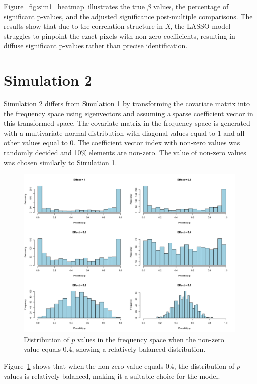 \documentclass[12pt]{article}
\begin{document}
Figure~\ref{fig:sim1_heatmap} illustrates the true \(\beta\) values, the percentage of significant p-values, and the adjusted significance post-multiple comparisons. The results show that due to the correlation structure in \( X \), the LASSO model struggles to pinpoint the exact pixels with non-zero coefficients, resulting in diffuse significant p-values rather than precise identification.

\section*{Simulation 2}

Simulation 2 differs from Simulation 1 by transforming the covariate matrix into the frequency space using eigenvectors and assuming a sparse coefficient vector in this transformed space. The covariate matrix in the frequency space is generated with a multivariate normal distribution with diagonal values equal to 1 and all other values equal to 0. The coefficient vector index with non-zero values was randomly decided and 10\% elements are non-zero. The value of non-zero values was chosen similarly to Simulation 1.


\begin{figure}[H]
  \centering
  \includegraphics[width=\textwidth]{../Figures/sim2_p_dist.png}
  \caption{Distribution of \(p\) values in the frequency space when the non-zero value equals 0.4, showing a relatively balanced distribution.}
  \label{fig:sim2_p_dist}
\end{figure}

Figure~\ref{fig:sim2_p_dist} shows that when the non-zero value equals 0.4, the distribution of \(p\) values is relatively balanced, making it a suitable choice for the model.
\end{document}
